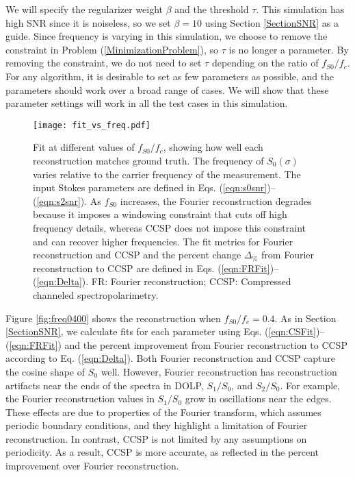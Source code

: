 \documentclass[10pt]{article}
\numberwithin{equation}{subsection}
\begin{document}
    We will specify the regularizer weight $\beta$ and the threshold $\tau$.
    This simulation has high SNR since it is noiseless, so we set $\beta = 10$ using Section \ref{SectionSNR} as a guide.
    Since frequency is varying in this simulation, we choose to remove the constraint in Problem (\ref{MinimizationProblem}), so $\tau$ is no longer a parameter.
    By removing the constraint, we do not need to set $\tau$ depending on the ratio of $f_{S0} / f_c$.
    For any algorithm, it is desirable to set as few parameters as possible, and the parameters should work over a broad range of cases.
    We will show that these parameter settings will work in all the test cases in this simulation.

\begin{figure}[!htb]
    \centering
    \texttt{[image: fit\_vs\_freq.pdf]}
    \caption{Fit at different values of $f_{S0} / f_c$, showing how well each reconstruction matches ground truth.
      The frequency of $S_0(\sigma)$ varies relative to the carrier frequency of the measurement.
      The input Stokes parameters are defined in Eqs. (\ref{eqn:s0snr})--(\ref{eqn:s2snr}).
      As $f_{S0}$ increases, the Fourier reconstruction degrades because it imposes a windowing constraint that cuts off high frequency details, whereas CCSP does not impose this constraint and can recover higher frequencies.
      The fit metrics for Fourier reconstruction and CCSP and the percent change $\Delta_\%$ from Fourier reconstruction to CCSP are defined in Eqs. (\ref{eqn:FRFit})--(\ref{eqn:Delta}).
      FR: Fourier reconstruction; CCSP: Compressed channeled spectropolarimetry.}
    \label{fig:FitVsFreq}
\end{figure}

    Figure \ref{fig:freq0400} shows the reconstruction when $f_{S0} / f_c = 0.4$.
    As in Section \ref{SectionSNR}, we calculate fits for each parameter using Eqs. (\ref{eqn:CSFit})--(\ref{eqn:FRFit}) and the percent improvement from Fourier reconstruction to CCSP according to Eq. (\ref{eqn:Delta}).
    Both Fourier reconstruction and CCSP capture the cosine shape of $S_0$ well.
    However, Fourier reconstruction has reconstruction artifacts near the ends of the spectra in DOLP, $S_1 / S_0$, and $S_2 / S_0$.
    For example, the Fourier reconstruction values in $S_1 / S_0$ grow in oscillations near the edges.
    These effects are due to properties of the Fourier transform, which assumes periodic boundary conditions, and they highlight a limitation of Fourier reconstruction.
    In contrast, CCSP is not limited by any assumptions on periodicity.
    As a result, CCSP is more accurate, as reflected in the percent improvement over Fourier reconstruction.
\end{document}
